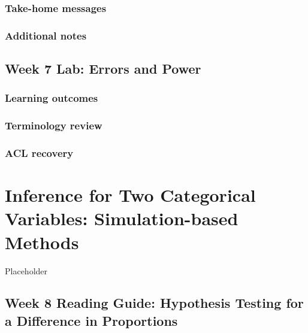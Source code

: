 \documentclass[
]{report}
\begin{document}
\hypertarget{take-home-messages-12}{%
\subsection{Take-home messages}\label{take-home-messages-12}}

\hypertarget{additional-notes-11}{%
\subsection{Additional notes}\label{additional-notes-11}}

\hypertarget{week-7-lab-errors-and-power}{%
\section{Week 7 Lab: Errors and Power}\label{week-7-lab-errors-and-power}}

\hypertarget{learning-outcomes-13}{%
\subsection{Learning outcomes}\label{learning-outcomes-13}}

\hypertarget{terminology-review-12}{%
\subsection{Terminology review}\label{terminology-review-12}}

\hypertarget{acl-recovery}{%
\subsection{ACL recovery}\label{acl-recovery}}

\hypertarget{inference-for-two-categorical-variables-simulation-based-methods}{%
\chapter{Inference for Two Categorical Variables: Simulation-based Methods}\label{inference-for-two-categorical-variables-simulation-based-methods}}

Placeholder

\hypertarget{week-8-reading-guide-hypothesis-testing-for-a-difference-in-proportions}{%
\section{Week 8 Reading Guide: Hypothesis Testing for a Difference in Proportions}\label{week-8-reading-guide-hypothesis-testing-for-a-difference-in-proportions}}
\end{document}
